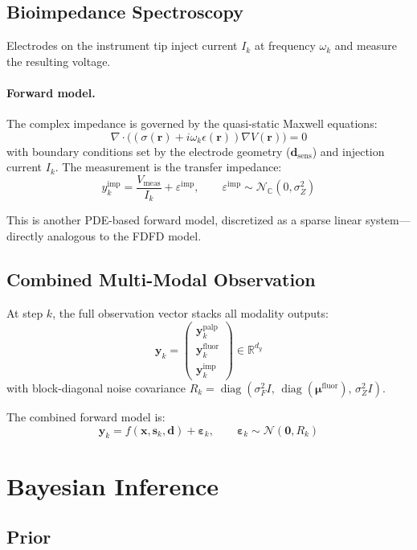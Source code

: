 \documentclass[11pt,a4paper]{article}
\newcommand{\R}{\mathbb{R}}
\newcommand{\diag}{\operatorname{diag}}
\theoremstyle{definition}
\begin{document}
\subsection{Bioimpedance Spectroscopy}

Electrodes on the instrument tip inject current $I_k$ at frequency $\omega_k$ and measure the resulting voltage.

\paragraph{Forward model.}
The complex impedance is governed by the quasi-static Maxwell equations:
\[
  \nabla \cdot \big((\sigma(\bm{r}) + i\omega_k \epsilon(\bm{r})) \nabla V(\bm{r})\big) = 0
\]
with boundary conditions set by the electrode geometry ($\bm{d}_{\text{sens}}$) and injection current $I_k$.  The measurement is the transfer impedance:
\[
  y^{\text{imp}}_k = \frac{V_{\text{meas}}}{I_k} + \varepsilon^{\text{imp}}, \qquad \varepsilon^{\text{imp}} \sim \mathcal{N}_{\mathbb{C}}(0, \sigma_Z^2)
\]

This is another PDE-based forward model, discretized as a sparse linear system---directly analogous to the FDFD model.

\subsection{Combined Multi-Modal Observation}

At step $k$, the full observation vector stacks all modality outputs:
\[
  \bm{y}_k = \begin{pmatrix} \bm{y}^{\text{palp}}_k \\ \bm{y}^{\text{fluor}}_k \\ \bm{y}^{\text{imp}}_k \end{pmatrix} \in \R^{d_y}
\]
with block-diagonal noise covariance $R_k = \diag(\sigma_F^2 I, \, \diag(\bm{\mu}^{\text{fluor}}), \, \sigma_Z^2 I)$.

The combined forward model is:
\[
  \bm{y}_k = f(\bm{x}, \bm{s}_k, \bm{d}) + \bm{\varepsilon}_k, \qquad \bm{\varepsilon}_k \sim \mathcal{N}(\bm{0}, R_k)
\]

\section{Bayesian Inference}

\subsection{Prior}
\end{document}
